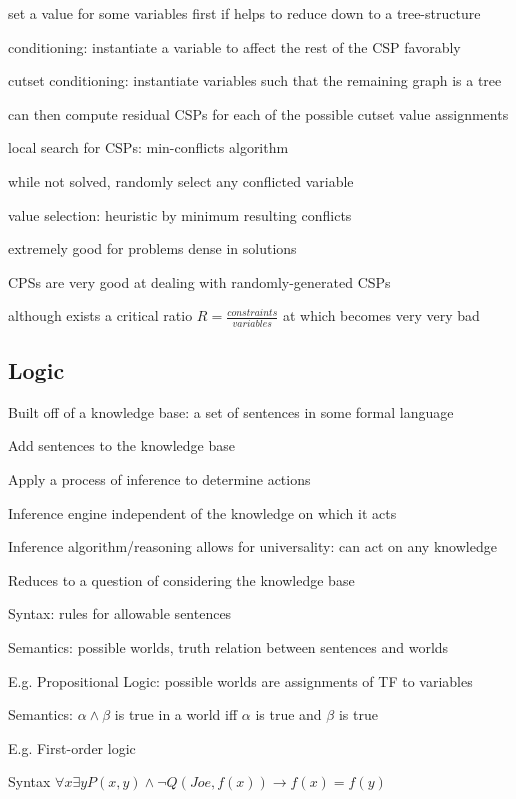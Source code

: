 \documentclass[12pt]{article}
\begin{document}
set a value for some variables first if helps to reduce down to a tree-structure

conditioning: instantiate a variable to affect the rest of the CSP favorably

cutset conditioning: instantiate variables such that the remaining graph is a tree

can then compute residual CSPs for each of the possible cutset value assignments

\noindent
local search for CSPs: min-conflicts algorithm

while not solved, randomly select any conflicted variable

value selection: heuristic by minimum resulting conflicts

extremely good for problems dense in solutions

CPSs are very good at dealing with randomly-generated CSPs

although exists a critical ratio $R = \frac{constraints}{variables}$ at which becomes very very bad

\subsection{Logic}

\noindent
Built off of a knowledge base: a set of sentences in some formal language

Add sentences to the knowledge base

Apply a process of inference to determine actions

Inference engine independent of the knowledge on which it acts

Inference algorithm/reasoning allows for universality: can act on any knowledge

Reduces to a question of considering the knowledge base

\noindent
Syntax: rules for allowable sentences

\noindent
Semantics: possible worlds, truth relation between sentences and worlds

\noindent
E.g. Propositional Logic: possible worlds are assignments of TF to variables

Semantics: $\alpha \wedge \beta$ is true in a world iff $\alpha$ is true and $\beta$ is true

\noindent
E.g. First-order logic

Syntax $\forall x \exists y P(x, y) \wedge \neg Q(Joe, f(x)) \to f(x) = f(y)$
\end{document}
